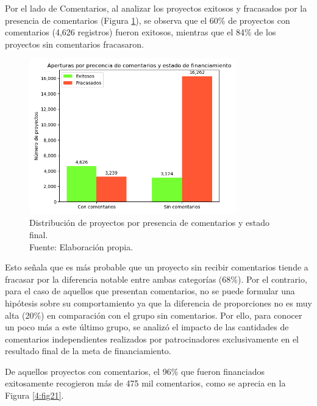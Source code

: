 Por el lado de Comentarios, al analizar los proyectos exitosos y fracasados por la presencia de comentarios (Figura \ref{4:fig20}), se observa que el 60\% de proyectos con comentarios (4,626 registros) fueron exitosos, mientras que el 84\% de los proyectos sin comentarios fracasaron.

\begin{figure}[!ht]
	\begin{center}
		\includegraphics[width=0.80\textwidth]{4/figures/projects comment by state.png}
		\caption[Distribución de proyectos por presencia de comentarios y estado final]{Distribución de proyectos por presencia de comentarios y estado final.\\
			Fuente: Elaboración propia.}
		\label{4:fig20}
	\end{center}
\end{figure}

Esto señala que es más probable que un proyecto sin recibir comentarios tiende a fracasar por la diferencia notable entre ambas categorías (68\%). Por el contrario, para el caso de aquellos que presentan comentarios, no se puede formular una hipótesis sobre su comportamiento ya que la diferencia de proporciones no es muy alta (20\%) en comparación con el grupo sin comentarios. Por ello, para conocer un poco más a este último grupo, se analizó el impacto de las cantidades de comentarios independientes realizados por patrocinadores exclusivamente en el resultado final de la meta de financiamiento.

\newpage
De aquellos proyectos con comentarios, el 96\% que fueron financiados exitosamente recogieron más de 475 mil comentarios, como se aprecia en la Figura \ref{4:fig21}.

